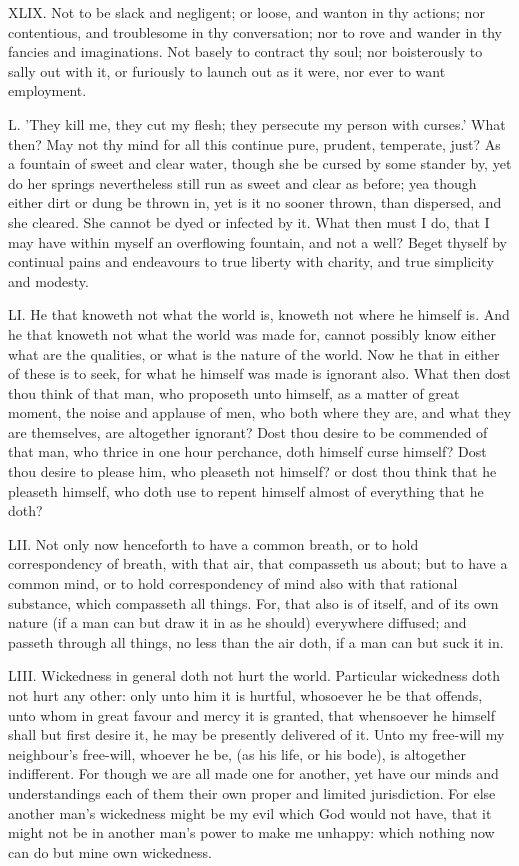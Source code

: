 XLIX. Not to be slack and negligent; or loose, and wanton in thy
actions; nor contentious, and troublesome in thy conversation; nor to rove
and wander in thy fancies and imaginations. Not basely to contract thy
soul; nor boisterously to sally out with it, or furiously to launch out as
it were, nor ever to want employment.

L. 'They kill me, they cut my flesh; they persecute my person with
curses.' What then? May not thy mind for all this continue pure, prudent,
temperate, just? As a fountain of sweet and clear water, though she be
cursed by some stander by, yet do her springs nevertheless still run as
sweet and clear as before; yea though either dirt or dung be thrown in,
yet is it no sooner thrown, than dispersed, and she cleared. She cannot be
dyed or infected by it. What then must I do, that I may have within myself
an overflowing fountain, and not a well? Beget thyself by continual pains
and endeavours to true liberty with charity, and true simplicity and
modesty.

LI. He that knoweth not what the world is, knoweth not where he himself
is. And he that knoweth not what the world was made for, cannot possibly
know either what are the qualities, or what is the nature of the world.
Now he that in either of these is to seek, for what he himself was made is
ignorant also. What then dost thou think of that man, who proposeth unto
himself, as a matter of great moment, the noise and applause of men, who
both where they are, and what they are themselves, are altogether
ignorant? Dost thou desire to be commended of that man, who thrice in one
hour perchance, doth himself curse himself? Dost thou desire to please
him, who pleaseth not himself? or dost thou think that he pleaseth
himself, who doth use to repent himself almost of everything that he doth?

LII. Not only now henceforth to have a common breath, or to hold
correspondency of breath, with that air, that compasseth us about; but to
have a common mind, or to hold correspondency of mind also with that
rational substance, which compasseth all things. For, that also is of
itself, and of its own nature (if a man can but draw it in as he should)
everywhere diffused; and passeth through all things, no less than the air
doth, if a man can but suck it in.

LIII. Wickedness in general doth not hurt the world. Particular
wickedness doth not hurt any other: only unto him it is hurtful, whosoever
he be that offends, unto whom in great favour and mercy it is granted,
that whensoever he himself shall but first desire it, he may be presently
delivered of it. Unto my free-will my neighbour's free-will, whoever he
be, (as his life, or his bode), is altogether indifferent. For though we
are all made one for another, yet have our minds and understandings each
of them their own proper and limited jurisdiction. For else another man's
wickedness might be my evil which God would not have, that it might not be
in another man's power to make me unhappy: which nothing now can do but
mine own wickedness.

